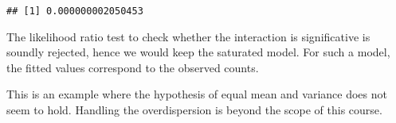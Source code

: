 \documentclass[]{book}
\newenvironment{Shaded}{\begin{snugshade}}{\end{snugshade}}
\newcommand{\CommentTok}[1]{\textcolor[rgb]{0.56,0.35,0.01}{\textit{#1}}}
\newcommand{\DataTypeTok}[1]{\textcolor[rgb]{0.13,0.29,0.53}{#1}}
\newcommand{\DecValTok}[1]{\textcolor[rgb]{0.00,0.00,0.81}{#1}}
\newcommand{\KeywordTok}[1]{\textcolor[rgb]{0.13,0.29,0.53}{\textbf{#1}}}
\newcommand{\NormalTok}[1]{#1}
\newcommand{\OperatorTok}[1]{\textcolor[rgb]{0.81,0.36,0.00}{\textbf{#1}}}
\newcommand{\StringTok}[1]{\textcolor[rgb]{0.31,0.60,0.02}{#1}}
\theoremstyle{definition}
\theoremstyle{definition}
\theoremstyle{definition}
\theoremstyle{remark}
\begin{document}
\begin{Shaded}
\end{Shaded}

\begin{verbatim}
## [1] 0.000000002050453
\end{verbatim}

The likelihood ratio test to check whether the interaction is significative is soundly rejected, hence we would keep the saturated model. For such a model, the fitted values correspond to the observed counts.

This is an example where the hypothesis of equal mean and variance does not seem to hold. Handling the overdispersion is beyond the scope of this course.


\end{document}
